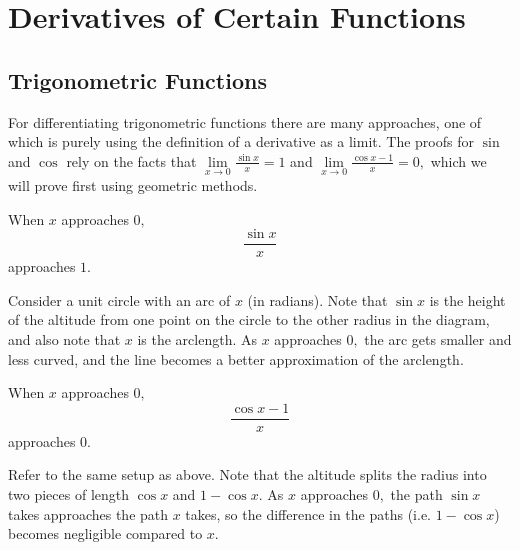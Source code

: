 \documentclass{article}
\begin{document}
\section{Derivatives of Certain Functions}

\subsection{Trigonometric Functions}

For differentiating trigonometric functions there are many approaches, one of which is purely using the definition of a derivative as a limit. The proofs for $\sin$ and $\cos$ rely on the facts that $\lim\limits_{x\to 0}\frac{\sin x}{x}=1$ and $\lim\limits_{x\to 0}\frac{\cos x-1}{x}=0,$ which we will prove first using geometric methods.

\begin{theo}
When $x$ approaches $0,$
\[\frac{\sin x}{x}\]
approaches $1.$
\end{theo}

\begin{pro}
Consider a unit circle with an arc of $x$ (in radians). Note that $\sin x$ is the height of the altitude from one point on the circle to the other radius in the diagram, and also note that $x$ is the arclength. As $x$ approaches $0,$ the arc gets smaller and less curved, and the line becomes a better approximation of the arclength.

\begin{center}
\end{center}
\end{pro}

\begin{theo}
When $x$ approaches $0,$
\[\frac{\cos x-1}{x}\]
approaches $0.$
\end{theo}

\begin{pro}
Refer to the same setup as above. Note that the altitude splits the radius into two pieces of length $\cos x$ and $1-\cos x.$ As $x$ approaches $0,$ the path $\sin x$ takes approaches the path $x$ takes, so the difference in the paths (i.e. $1-\cos x$) becomes negligible compared to $x.$
\end{pro}
\end{document}
